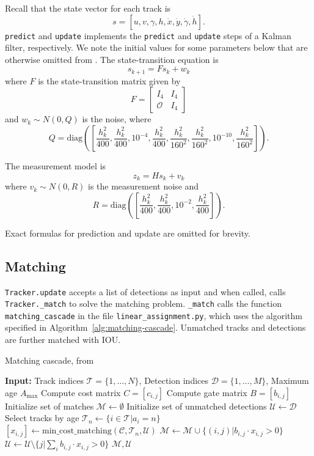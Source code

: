 \documentclass[conference]{IEEEtran}
\begin{document}
Recall that the state vector for each track is
\[
    s = [u, v, \gamma, h, \dot{x}, \dot{y}, \dot{\gamma}, \dot{h}].
\]
\texttt{predict} and \texttt{update} implements the \texttt{predict} and \texttt{update} steps of a Kalman filter, respectively. We note the initial values for some parameters below that are otherwise omitted from \cite{Wojke2018deep}. The state-transition equation is
\[
    s_{k + 1} = Fs_k + w_k
\]
where $F$ is the state-transition matrix given by
\[
    F = \begin{bmatrix}
        I_4 & I_4\\
        \mathcal{O} & I_4
    \end{bmatrix}
\]
and $w_k \sim N(0, Q)$ is the noise, where
\[
    Q = \mathrm{diag}([\frac{h_k^2}{400}, \frac{h_k^2}{400}, 10^{-4}, \frac{h_k^2}{400}, \frac{h_k^2}{160^2}, \frac{h_k^2}{160^2}, 10^{-10}, \frac{h_k^2}{160^2}]).
\]

The measurement model is
\[
    z_k = Hs_k + v_k
\]
where $v_k \sim N(0, R)$ is the measurement noise and
\[
    R = \mathrm{diag}([\frac{h_k^2}{400}, \frac{h_k^2}{400}, 10^{-2}, \frac{h_k^2}{400}]).
\]

Exact formulas for prediction and update are omitted for brevity.

\subsection{Matching}

\texttt{Tracker.update} accepts a list of detections as input and when called, calls \texttt{Tracker.\_match} to solve the matching problem. \texttt{\_match} calls the function \texttt{matching\_cascade} in the file \texttt{linear\_assignment.py}, which uses the algorithm specified in Algorithm~\ref{alg:matching-cascade}. Unmatched tracks and detections are further matched with IOU.

\begin{algorithm}[t]
    \caption{Matching cascade, from \cite{Wojke2018deep}}
    \label{alg:matching-cascade}
    \begin{algorithmic}[1]
        \Statex \textbf{Input:} Track indices $\mathcal{T} = \{1, \dots, N\}$, Detection indices $\mathcal{D} = \{1, \dots, M\}$, Maximum age $A_\textrm{max}$
        \State Compute cost matrix $C = [c_{i,j}]$
        \State Compute gate matrix $B = [b_{i,j}]$
        \State Initialize set of matches $\mathcal{M} \gets \emptyset$
        \State Initialize set of unmatched detections $\mathcal{U} \gets \mathcal{D}$
            \State Select tracks by age $\mathcal{T}_n \gets \{i \in \mathcal{T} | a_i = n\}$
            \State $[x_{i,j}] \gets \mathrm{min\_cost\_matching}(\mathcal{C}, \mathcal{T}_n, \mathcal{U})$
            \State $\mathcal{M} \gets \mathcal{M} \cup \{(i, j) | b_{i,j} \cdot x_{i,j} > 0\}$
            \State $\mathcal{U} \gets \mathcal{U} \setminus \{j | \sum_i b_{i,j} \cdot x_{i,j} > 0\}$
        \EndFor
        \State \Return $\mathcal{M}, \mathcal{U}$
    \end{algorithmic}
\end{algorithm}
\end{document}
